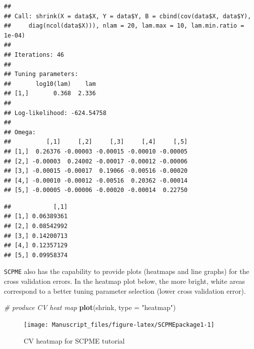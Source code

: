 \documentclass[11pt,]{report}
\newenvironment{Shaded}{\begin{snugshade}}{\end{snugshade}}
\newcommand{\CommentTok}[1]{\textcolor[rgb]{0.56,0.35,0.01}{\textit{#1}}}
\newcommand{\DataTypeTok}[1]{\textcolor[rgb]{0.13,0.29,0.53}{#1}}
\newcommand{\DecValTok}[1]{\textcolor[rgb]{0.00,0.00,0.81}{#1}}
\newcommand{\KeywordTok}[1]{\textcolor[rgb]{0.13,0.29,0.53}{\textbf{#1}}}
\newcommand{\NormalTok}[1]{#1}
\newcommand{\OperatorTok}[1]{\textcolor[rgb]{0.81,0.36,0.00}{\textbf{#1}}}
\newcommand{\OtherTok}[1]{\textcolor[rgb]{0.56,0.35,0.01}{#1}}
\newcommand{\StringTok}[1]{\textcolor[rgb]{0.31,0.60,0.02}{#1}}
\theoremstyle{definition}
\theoremstyle{definition}
\theoremstyle{definition}
\theoremstyle{remark}
\begin{document}
\begin{verbatim}
## 
## Call: shrink(X = data$X, Y = data$Y, B = cbind(cov(data$X, data$Y), 
##     diag(ncol(data$X))), nlam = 20, lam.max = 10, lam.min.ratio = 1e-04)
## 
## Iterations: 46
## 
## Tuning parameters:
##       log10(lam)    lam
## [1,]       0.368  2.336
## 
## Log-likelihood: -624.54758
## 
## Omega:
##          [,1]     [,2]     [,3]     [,4]     [,5]
## [1,]  0.26376 -0.00003 -0.00015 -0.00010 -0.00005
## [2,] -0.00003  0.24002 -0.00017 -0.00012 -0.00006
## [3,] -0.00015 -0.00017  0.19066 -0.00516 -0.00020
## [4,] -0.00010 -0.00012 -0.00516  0.20362 -0.00014
## [5,] -0.00005 -0.00006 -0.00020 -0.00014  0.22750
\end{verbatim}

\begin{Shaded}
\end{Shaded}

\begin{verbatim}
##            [,1]
## [1,] 0.06389361
## [2,] 0.08542992
## [3,] 0.14200713
## [4,] 0.12357129
## [5,] 0.09958374
\end{verbatim}

\vspace{0.5cm}

\texttt{SCPME} also has the capability to provide plots (heatmaps and line graphs) for the cross validation errors. In the heatmap plot below, the more bright, white areas correspond to a better tuning parameter selection (lower cross validation error).

\vspace{0.5cm}

\begin{Shaded}
\begin{Highlighting}[]
\CommentTok{# produce CV heat map}
\KeywordTok{plot}\NormalTok{(shrink, }\DataTypeTok{type =} \StringTok{"heatmap"}\NormalTok{)}
\end{Highlighting}
\end{Shaded}

\begin{figure}

{\centering \texttt{[image: Manuscript\_files/figure-latex/SCPMEpackage1-1]} 

}

\caption{CV heatmap for SCPME tutorial}\label{fig:SCPMEpackage1}
\end{figure}
\end{document}
